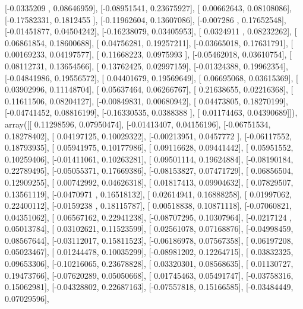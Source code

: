 \documentclass{article}
\begin{document}
       [-0.0335209 ,  0.08646959],
       [-0.08951541,  0.23675927],
       [ 0.00662643,  0.08108086],
       [-0.17582331,  0.1812455 ],
       [-0.11962604,  0.13607086],
       [-0.007286  ,  0.17652548],
       [-0.01451877,  0.04504242],
       [-0.16238079,  0.03405953],
       [ 0.0324911 ,  0.08232262],
       [ 0.06861854,  0.18600688],
       [ 0.04756281,  0.19257211],
       [-0.03665018,  0.17631791],
       [ 0.00169233,  0.04197577],
       [ 0.11668223,  0.0975993 ],
       [-0.05462018,  0.03610754],
       [ 0.08112731,  0.13654566],
       [ 0.13762425,  0.02997159],
       [-0.01324388,  0.19962354],
       [-0.04841986,  0.19556572],
       [ 0.04401679,  0.19569649],
       [ 0.06695068,  0.03615369],
       [ 0.03902996,  0.11148704],
       [ 0.05637464,  0.06266767],
       [ 0.21638655,  0.02216368],
       [ 0.11611506,  0.08204127],
       [-0.00849831,  0.00680942],
       [ 0.04473805,  0.18270199],
       [-0.04741452,  0.08816199],
       [-0.16330535,  0.0388388 ],
       [ 0.01174463,  0.04390689]]), array([[ 0.11298596,  0.07950474],
       [-0.01413407,  0.04156196],
       [-0.06751534,  0.18278402],
       [ 0.04197125,  0.10029322],
       [-0.00213951,  0.0457772 ],
       [-0.06117552,  0.18793935],
       [ 0.05941975,  0.10177986],
       [ 0.09116628,  0.09441442],
       [ 0.05951552,  0.10259406],
       [-0.01411061,  0.10263281],
       [ 0.09501114,  0.19624884],
       [-0.08190184,  0.22789495],
       [-0.05055371,  0.17669386],
       [-0.08153827,  0.07471729],
       [ 0.06856504,  0.12909255],
       [ 0.00742992,  0.04626318],
       [ 0.01817413,  0.09904632],
       [ 0.07829507,  0.13561119],
       [-0.0470971 ,  0.16518132],
       [ 0.02614941,  0.16888258],
       [ 0.01997062,  0.22400112],
       [-0.0159238 ,  0.18115787],
       [ 0.00518838,  0.10871118],
       [-0.07060821,  0.04351062],
       [ 0.06567162,  0.22941238],
       [-0.08707295,  0.10307964],
       [-0.0217124 ,  0.05013784],
       [ 0.03102621,  0.11523599],
       [ 0.02561078,  0.07168876],
       [-0.04998459,  0.08567644],
       [-0.03112017,  0.15811523],
       [-0.06186978,  0.07567358],
       [ 0.06197208,  0.05023467],
       [ 0.01244478,  0.10035299],
       [-0.08981202,  0.12264715],
       [ 0.03832325,  0.09653306],
       [-0.10216065,  0.23678828],
       [ 0.03320301,  0.08568635],
       [ 0.01130727,  0.19473766],
       [-0.07620289,  0.05050668],
       [ 0.01745463,  0.05491747],
       [-0.03758316,  0.15062981],
       [-0.04328802,  0.22687163],
       [-0.07557818,  0.15166585],
       [-0.03484449,  0.07029596],
\end{document}
